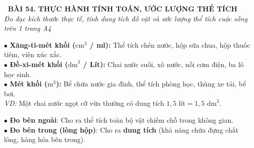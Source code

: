 \documentclass[14pt,a4paper,oneside]{extbook}
\begin{document}
\noindent
\begin{tcolorbox}[
  enhanced,
  colback=teal!8!white,
  colframe=teal!80!black,
  arc=3mm,
  boxrule=1.1pt,
  width=\linewidth,
  halign=center,
  top=2.2mm, bottom=2.2mm,
  left=3mm, right=3mm,
  drop fuzzy shadow
]
  {\large\bfseries\color{teal!95!black}\faBookmark\ BÀI 54. THỰC HÀNH TÍNH TOÁN, ƯỚC LƯỢNG THỂ TÍCH}\\[2pt]
  {\scriptsize\color{black!75}\itshape Đo đạc kích thước thực tế, tính dung tích đồ vật và ước lượng thể tích cuộc sống trên 1 trang A4}
\end{tcolorbox}

\vspace{3.2mm}
\noindent
\begin{minipage}[t]{0.54\textwidth}
  \begin{tcolorbox}[
    enhanced,
    title={\footnotesize\bfseries\color{white}\faEye\ 1. Chọn đơn vị thể tích phù hợp},
    colback=blue!2!white,
    colframe=blue!75!black,
    arc=2.5mm, boxrule=0.8pt, top=1.8mm, bottom=1.8mm, left=2.2mm, right=2.2mm
  ]
    \footnotesize
    $\bullet$ \textbf{Xăng-ti-mét khối ($\text{cm}^3$ / ml):} Thể tích chén nước, hộp sữa chua, hộp thuốc tiêm, viên xúc xắc.\\
    $\bullet$ \textbf{Đề-xi-mét khối ($\text{dm}^3$ / Lít):} Chai nước suối, xô nước, nồi cơm điện, ba lô học sinh.\\
    $\bullet$ \textbf{Mét khối ($\text{m}^3$):} Bể chứa nước gia đình, thể tích phòng học, thùng xe tải, bể bơi.\\
    \textit{VD:} Một chai nước ngọt cỡ vừa thường có dung tích $1,5\text{ lít} = 1,5\text{ dm}^3$.
  \end{tcolorbox}
\end{minipage}%
\hfill
\begin{minipage}[t]{0.44\textwidth}
  \begin{tcolorbox}[
    enhanced,
    title={\footnotesize\bfseries\color{white}\faRulerCombined\ 2. Kỹ năng đo đạc vật thể},
    colback=teal!2!white,
    colframe=teal!75!black,
    arc=2.5mm, boxrule=0.8pt, top=1.8mm, bottom=1.8mm, left=2mm, right=2mm
  ]
    \footnotesize
    $\bullet$ \textbf{Đo bên ngoài}: Cho ra thể tích toàn bộ vật chiếm chỗ trong không gian.\\
    $\bullet$ \textbf{Đo bên trong (lòng hộp)}: Cho ra \textbf{dung tích} (khả năng chứa đựng chất lỏng, hàng hóa bên trong).
  \end{tcolorbox}
\end{minipage}
\end{document}
